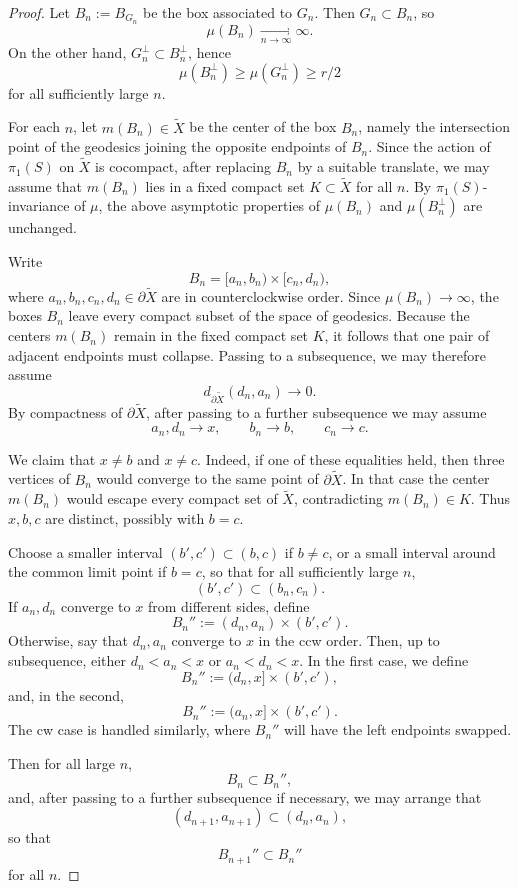 \documentclass[12pt]{amsart}
\numberwithin{equation}{section}
\numberwithin{figure}{section}
\theoremstyle{definition}
\theoremstyle{plain}
\begin{document}
\begin{proof}
Let $B_n:=B_{G_n}$ be the box associated to $G_n$. Then $G_n\subset B_n$, so
\[
\mu(B_n)\xrightarrow[n\to\infty]{}\infty.
\]
On the other hand, $G_n^\perp\subset B_n^\perp$, hence
\[
\mu(B_n^\perp)\ge \mu(G_n^\perp)\ge r/2
\]
for all sufficiently large $n$.

For each $n$, let $m(B_n)\in \widetilde X$ be the center of the box $B_n$, namely the intersection point of the geodesics joining the opposite endpoints of $B_n$. Since the action of $\pi_1(S)$ on $\widetilde X$ is cocompact, after replacing $B_n$ by a suitable translate, we may assume that $m(B_n)$ lies in a fixed compact set $K\subset \widetilde X$ for all $n$. By $\pi_1(S)$-invariance of $\mu$, the above asymptotic properties of $\mu(B_n)$ and $\mu(B_n^\perp)$ are unchanged.

Write
\[
B_n=[a_n,b_n)\times[c_n,d_n),
\]
where $a_n,b_n,c_n,d_n\in \partial \widetilde X$ are in counterclockwise order. Since $\mu(B_n)\to\infty$, the boxes $B_n$ leave every compact subset of the space of geodesics. Because the centers $m(B_n)$ remain in the fixed compact set $K$, it follows that one pair of adjacent endpoints must collapse. Passing to a subsequence, we may therefore assume
\[
d_{\partial \widetilde X}(d_n,a_n)\to 0.
\]
By compactness of $\partial \widetilde X$, after passing to a further subsequence we may assume
\[
a_n,d_n\to x,\qquad b_n\to b,\qquad c_n\to c.
\]

We claim that $x\neq b$ and $x\neq c$. Indeed, if one of these equalities held, then three vertices of $B_n$ would converge to the same point of $\partial \widetilde X$. In that case the center $m(B_n)$ would escape every compact set of $\widetilde X$, contradicting $m(B_n)\in K$. Thus $x,b,c$ are distinct, possibly with $b=c$.

Choose a smaller interval $(b',c')\subset (b,c)$ if $b\neq c$, or a small interval around the common limit point if $b=c$, so that for all sufficiently large $n$,
\[
(b',c')\subset (b_n,c_n).
\]
If $a_n,d_n$ converge to $x$ from different sides, define
\[
B_n'':=(d_n,a_n)\times (b',c').
\]
Otherwise, say that $d_n, a_n$ converge to $x$ in the ccw order. Then, up to subsequence, either $d_n < a_n < x$ or $a_n < d_n < x$. In the first  case, we define 
\[
B_n'':=(d_n,x]\times (b',c'),
\]
and, in the second,
\[
B_n'':=(a_n,x]\times (b',c').
\]
The cw case is handled similarly, where $B_n''$ will have the left endpoints swapped.

Then for all large $n$,
\[
B_n\subset B_n'',
\]
and, after passing to a further subsequence if necessary, we may arrange that
\[
(d_{n+1},a_{n+1})\subset (d_n,a_n),
\]
so that
\[
B_{n+1}''\subset B_n''
\]
for all $n$.


\end{proof}
\end{document}

